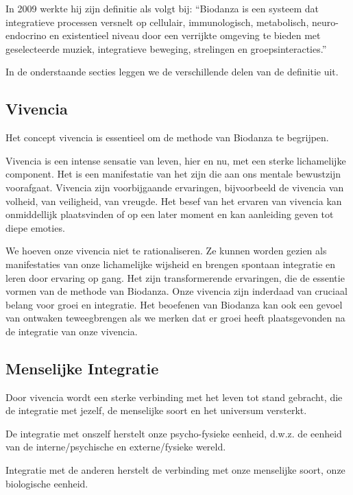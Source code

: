 \documentclass[
  11pt,
]{book}
\begin{document}
In 2009 werkte hij zijn definitie als volgt bij: ``Biodanza is een systeem dat integratieve processen versnelt op cellulair, immunologisch, metabolisch, neuro-endocrino en existentieel niveau door een verrijkte omgeving te bieden met geselecteerde muziek, integratieve beweging, strelingen en groepsinteracties.''

In de onderstaande secties leggen we de verschillende delen van de definitie uit.

\hypertarget{vivencia}{%
\subsection{Vivencia}\label{vivencia}}

Het concept vivencia is essentieel om de methode van Biodanza te begrijpen.

Vivencia is een intense sensatie van leven, hier en nu, met een sterke lichamelijke component. Het is een manifestatie van het zijn die aan ons mentale bewustzijn voorafgaat. Vivencia zijn voorbijgaande ervaringen, bijvoorbeeld de vivencia van volheid, van veiligheid, van vreugde. Het besef van het ervaren van vivencia kan onmiddellijk plaatsvinden of op een later moment en kan aanleiding geven tot diepe emoties.

We hoeven onze vivencia niet te rationaliseren. Ze kunnen worden gezien als manifestaties van onze lichamelijke wijsheid en brengen spontaan integratie en leren door ervaring op gang. Het zijn transformerende ervaringen, die de essentie vormen van de methode van Biodanza. Onze vivencia zijn inderdaad van cruciaal belang voor groei en integratie. Het beoefenen van Biodanza kan ook een gevoel van ontwaken teweegbrengen als we merken dat er groei heeft plaatsgevonden na de integratie van onze vivencia.

\hypertarget{menselijke-integratie}{%
\subsection{Menselijke Integratie}\label{menselijke-integratie}}

Door vivencia wordt een sterke verbinding met het leven tot stand gebracht, die de integratie met jezelf, de menselijke soort en het universum versterkt.

De integratie met onszelf herstelt onze psycho-fysieke eenheid, d.w.z. de eenheid van de interne/psychische en externe/fysieke wereld.

Integratie met de anderen herstelt de verbinding met onze menselijke soort, onze biologische eenheid.
\end{document}
